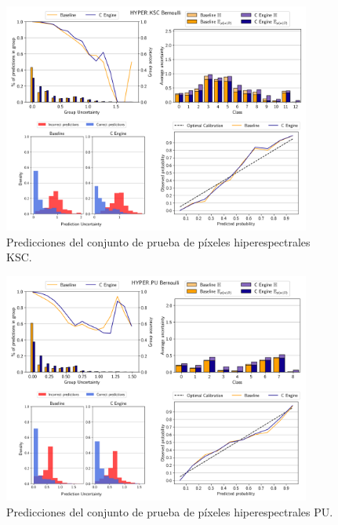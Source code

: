 \begin{figure}[ht]
    \centering
    \includegraphics[width=0.9\textwidth]{root/Imagenes/anexo/Bernoulli-HYPER_KSC-mosaic.png}
    \caption{Predicciones del conjunto de prueba de píxeles hiperespectrales KSC.}
    \label{fig:anx-Bernoulli-HYPER_KSC}
\end{figure}


\begin{figure}[ht]
    \centering
    \includegraphics[width=0.9\textwidth]{root/Imagenes/anexo/Bernoulli-HYPER_PU-mosaic.png}
    \caption{Predicciones del conjunto de prueba de píxeles hiperespectrales PU.}
    \label{fig:anx-Bernoulli-HYPER_PU}
\end{figure}


